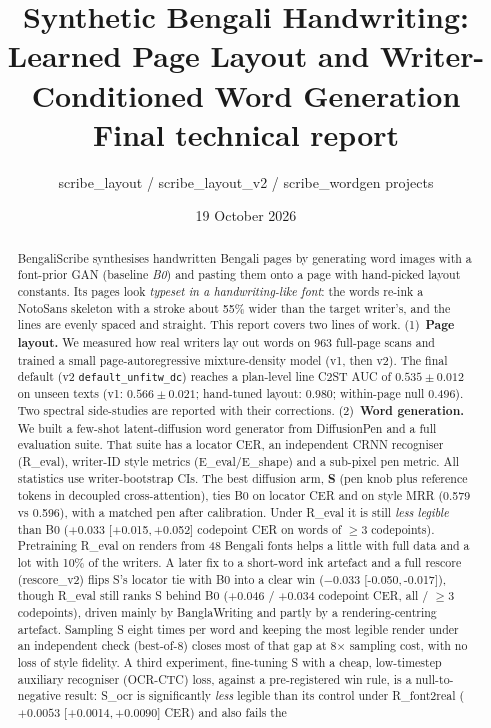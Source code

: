 \documentclass[10.5pt,a4paper]{article}
\title{\textbf{Synthetic Bengali Handwriting:\\ Learned Page Layout and Writer-Conditioned Word Generation}\\[4pt]
\large Final technical report}
\author{scribe\_layout / scribe\_layout\_v2 / scribe\_wordgen projects}
\date{19 October 2026}
\newcommand{\ci}[2]{{\footnotesize[#1,\,#2]}}
\begin{document}
\maketitle

\begin{abstract}
\noindent BengaliScribe synthesises handwritten Bengali pages by generating word images with a font-prior GAN (baseline
\emph{B0}) and pasting them onto a page with hand-picked layout constants. Its pages look \emph{typeset in a handwriting-like
font}: the words re-ink a NotoSans skeleton with a stroke about 55\% wider than the target writer's, and the lines are evenly
spaced and straight. This report covers two lines of work. (1)~\textbf{Page layout.} We measured how real writers lay out
words on 963 full-page scans and trained a small page-autoregressive mixture-density model (v1, then v2). The final default
(v2 \texttt{default\_unfitw\_dc}) reaches a plan-level line C2ST AUC of $0.535\pm0.012$ on unseen texts (v1: $0.566\pm0.021$;
hand-tuned layout: 0.980; within-page null 0.496). Two spectral side-studies are reported with their corrections.
(2)~\textbf{Word generation.} We built a few-shot latent-diffusion word generator from DiffusionPen and a full evaluation suite.
That suite has a locator CER, an independent CRNN recogniser (R\_eval), writer-ID style metrics (E\_eval/E\_shape) and a
sub-pixel pen metric. All statistics use writer-bootstrap CIs. The best diffusion arm, \textbf{S} (pen knob plus reference
tokens in decoupled cross-attention), ties B0 on locator CER and on style MRR (0.579 vs 0.596), with a matched pen after
calibration. Under R\_eval it is still \emph{less legible} than B0 ($+0.033$ \ci{+0.015}{+0.052} codepoint CER on words of
$\ge$3 codepoints). Pretraining R\_eval on renders from 48 Bengali fonts helps a little with full data and a lot with 10\% of
the writers. A later fix to a short-word ink artefact and a full rescore (rescore\_v2) flips S's locator tie with B0 into a
clear win ($-0.033$ \ci{-0.050}{-0.017}), though R\_eval still ranks S behind B0 ($+0.046$ / $+0.034$ codepoint CER, all /
$\ge$3 codepoints), driven mainly by BanglaWriting and partly by a rendering-centring artefact. Sampling S eight times per
word and keeping the most legible render under an independent check (best-of-8) closes most of that gap at 8$\times$
sampling cost, with no loss of style fidelity. A third experiment, fine-tuning S with a cheap, low-timestep auxiliary
recogniser (OCR-CTC) loss, against a pre-registered win rule, is a null-to-negative result: S\_ocr is significantly
\emph{less} legible than its control under R\_font2real ($+0.0053$ \ci{+0.0014}{+0.0090} CER) and also fails the

\end{abstract}
\end{document}
